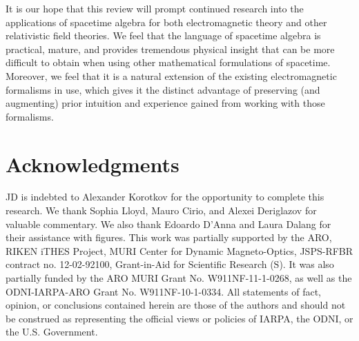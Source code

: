 \documentclass[1p,sort&compress]{elsarticle}
\numberwithin{equation}{section}
\begin{document}
It is our hope that this review will prompt continued research into the applications of spacetime algebra for both electromagnetic theory and other relativistic field theories.  We feel that the language of spacetime algebra is practical, mature, and provides tremendous physical insight that can be more difficult to obtain when using other mathematical formulations of spacetime.  Moreover, we feel that it is a natural extension of the existing electromagnetic formalisms in use, which gives it the distinct advantage of preserving (and augmenting) prior intuition and experience gained from working with those formalisms. 

\section*{Acknowledgments}
  JD is indebted to Alexander Korotkov for the opportunity to complete this research. We thank Sophia Lloyd, Mauro Cirio, and Alexei Deriglazov for valuable commentary. We also thank Edoardo D'Anna and Laura Dalang for their assistance with figures. This work was partially supported by the ARO, RIKEN iTHES Project, MURI Center for Dynamic Magneto-Optics, JSPS-RFBR contract no. 12-02-92100, Grant-in-Aid for Scientific Research (S). It was also partially funded by the ARO MURI Grant No. W911NF-11-1-0268, as well as the ODNI-IARPA-ARO Grant No. W911NF-10-1-0334. All statements of fact, opinion, or conclusions contained herein are those of the authors and should not be construed as representing the official views or policies of IARPA, the ODNI, or the U.S. Government. 

\end{document}
